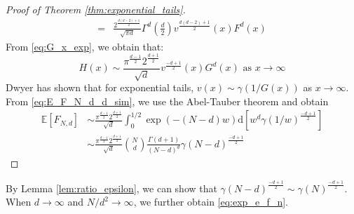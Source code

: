 \documentclass[conference,a4paper]{IEEEtran}
\def\E{\mathbb{E}}
\def\dd{\mathrm{d}}
\begin{document}
\begin{proof}[Proof of Theorem \ref{thm:exponential_tails}]
\begin{align*}
    =& \frac{2^{\frac{d(d-2)+1}{2}}}{\sqrt{\pi d}}\Gamma^d\left(\frac{d}{2}\right)
    v^{\frac{d(d-2)+1}{2}}(x)F^d(x)
\end{align*}
From \eqref{eq:G_x_exp}, we obtain that:
\begin{equation}\label{eq:H_x_exp}
     H(x) \sim \frac{\pi^{\frac{d-1}{2}} 2^{\frac{d+1}{2}}}{\sqrt{d}}v^{\frac{-d+1}{2}}(x)G^d(x)
     \textrm{ as } x\to \infty
\end{equation}
Dwyer \cite{dwyer1991convex} has shown that for exponential tails, $v(x) \sim \gamma(1/G(x))$ as $x\to \infty$.
From \eqref{eq:E_F_N_d_d_sim},
we use the Abel-Tauber theorem
\cite{omey1989abelian} and obtain
\begin{align*}
    \E[F_{N,d}] & \sim \frac{\pi^{\frac{d-1}{2}} 2^{\frac{d+1}{2}}}{\sqrt{d}}\int_0^{1/2} \exp(-(N-d)w) \dd [w^d \gamma(1/w)^{\frac{-d+1}{2}}] \\
    &\sim \frac{\pi^{\frac{d-1}{2}} 2^{\frac{d+1}{2}}}{\sqrt{d}} \binom{N}{d}\frac{\Gamma(d+1)}{(N-d)^d} \gamma(N-d)^{\frac{-d+1}{2}}
\end{align*}
\end{proof}


By Lemma \ref{lem:ratio_epsilon}, we can show that
$\gamma(N-d)^{\frac{-d+1}{2}}\sim \gamma(N)^{\frac{-d+1}{2}}$.
When $d\to\infty$ and $N/d^2\to \infty$, we further obtain \eqref{eq:exp_e_f_n}.
 
\end{document}
